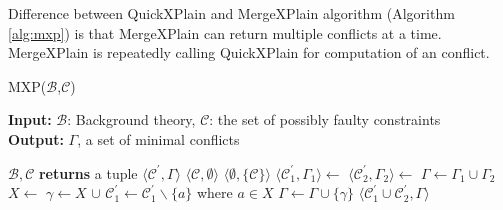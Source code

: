 \documentclass[12pt,a4paper]{article}
\begin{document}
Difference between QuickXPlain and MergeXPlain algorithm (Algorithm \ref{alg:mxp}) is that MergeXPlain can return multiple conflicts at a time. MergeXPlain is repeatedly calling QuickXPlain for computation of an conflict.

\begin{algorithm}[H]
	\footnotesize
	\caption{MXP($\mathcal{B}$,$\mathcal{C}$)}
	\label{alg:mxp}
	\textbf{Input:} $\mathcal{B}$: Background theory, $\mathcal{C}$: the set of possibly faulty constraints  \\
	\textbf{Output:} $\Gamma$, a set of minimal conflicts
	\begin{algorithmic}[1]
		\State {}
		\State \Return {$\emptyset$}
		\EndIf
		\State \Return {$\Gamma$}
		
		\medskip
		 {$\mathcal{B}, \mathcal{C}$} \textbf{returns} a tuple $\langle \mathcal{C}^{\prime}, \Gamma \rangle$
		\State \Return $\langle \mathcal{C}, \emptyset \rangle$
		\State \Return $\langle \emptyset, \{\mathcal{C}\} \rangle$
		\EndIf
		\State $\langle \mathcal{C}_{1}^{\prime}, \Gamma_{1} \rangle \gets$ 
		\State $\langle \mathcal{C}_{2}^{\prime}, \Gamma_{2} \rangle \gets$ 
		\State $\Gamma \gets \Gamma_{1} \cup \Gamma_{2}$
		\State $X \gets $ 
		\State $\gamma \gets X$ $\cup$ 
		\State $\mathcal{C}_{1}^{\prime} \gets \mathcal{C}_{1}^{\prime} \backslash \{a\}$ where $a \in X$
		\State $\Gamma \gets \Gamma \cup \{\gamma\}$
		\EndWhile
		\State \Return $\langle \mathcal{C}_{1}^{\prime} \cup \mathcal{C}_{2}^{\prime}, \Gamma \rangle$
		\EndFunction			
	\end{algorithmic}
\end{algorithm}
\end{document}
